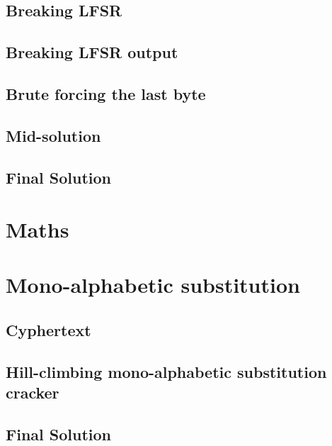 \documentclass[pdftex, 12pt, a4paper]{article}
\begin{document}
\subsection{Breaking LFSR}\label{break-lfsr}

\pagebreak

\subsection{Breaking LFSR output}\label{break-lfsr-out}
\pagebreak

\subsection{Brute forcing the last byte}\label{last-byte}

\pagebreak

\subsection{Mid-solution}\label{last-byte-out}

\subsection{Final Solution}\label{q1-solution}

\section{Maths}
\pagebreak

\section{Mono-alphabetic substitution}
\subsection{Cyphertext}\label{q3-cyphertext}

\subsection{Hill-climbing mono-alphabetic substitution cracker}\label{break-simplesub}


\subsection{Final Solution}\label{q3-solution}
\pagebreak
\end{document}
